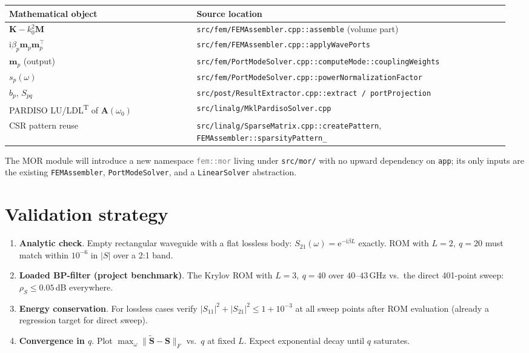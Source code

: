 \documentclass[11pt,a4paper]{article}
\newcommand{\im}{\mathrm{i}}
\begin{document}
\begin{table}[h]
\centering
\begin{tabular}{p{0.36\linewidth}p{0.6\linewidth}}
\toprule
Mathematical object & Source location \\
\midrule
$\bm K - k_0^2\bm M$ & \texttt{src/fem/FEMAssembler.cpp::assemble} (volume part)\\
$\im\beta_p\bm m_p\bm m_p^{\!\top}$ & \texttt{src/fem/FEMAssembler.cpp::applyWavePorts}\\
$\bm m_p$ (output) & \texttt{src/fem/PortModeSolver.cpp::computeMode::couplingWeights}\\
$s_p(\omega)$ & \texttt{src/fem/PortModeSolver.cpp::powerNormalizationFactor}\\
$b_p$, $S_{pq}$ & \texttt{src/post/ResultExtractor.cpp::extract / portProjection}\\
PARDISO LU/LDL\textsuperscript{T} of $\bm A(\omega_0)$ & \texttt{src/linalg/MklPardisoSolver.cpp}\\
CSR pattern reuse & \texttt{src/linalg/SparseMatrix.cpp::createPattern}, \texttt{FEMAssembler::sparsityPattern\_}\\
\bottomrule
\end{tabular}
\end{table}

The MOR module will introduce a new namespace
\textcolor{gray}{\texttt{fem::mor}} living under \texttt{src/mor/} with no
upward dependency on \texttt{app}; its only inputs are the existing
\texttt{FEMAssembler}, \texttt{PortModeSolver}, and a \texttt{LinearSolver}
abstraction.

\section{Validation strategy}

\begin{enumerate}
\item \textbf{Analytic check}. Empty rectangular waveguide with a flat
      lossless body: $S_{21}(\omega)=\mathrm{e}^{-\im\beta L}$ exactly.
      ROM with $L=2,\ q=20$ must match within $10^{-6}$ in $|S|$ over a
      2:1 band.
\item \textbf{Loaded BP-filter (project benchmark)}. The Krylov ROM with
      $L=3,\ q=40$ over $40$--$43$\,GHz vs.\ the direct 401-point sweep:
      $\rho_S \le 0.05$\,dB everywhere.
\item \textbf{Energy conservation}. For lossless cases verify
      $|S_{11}|^2+|S_{21}|^2 \le 1+10^{-3}$ at all sweep points after ROM
      evaluation (already a regression target for direct sweep).
\item \textbf{Convergence in $q$}. Plot $\max_\omega \|\widetilde{\bm
      S}-\bm S\|_F$ vs.\ $q$ at fixed $L$. Expect exponential decay until
      $q$ saturates.
\end{enumerate}
\end{document}
